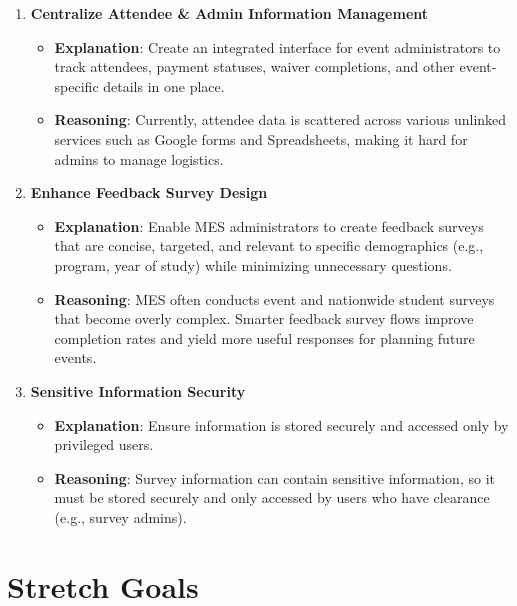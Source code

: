 \documentclass{article}
\begin{document}
\begin{enumerate}[align=left,
  leftmargin=*,
  itemindent=0em,
  label=\bfseries G-\arabic*:]
    \item \textbf{Centralize Attendee \& Admin Information Management}
    \begin{itemize}
        \item \textbf{Explanation}: Create an integrated interface for event administrators to track attendees, payment statuses, waiver completions, and other event-specific details in one place.
        \item \textbf{Reasoning}: Currently, attendee data is scattered across various unlinked services such as Google forms and Spreadsheets, making it hard for admins to manage logistics.
    \end{itemize}

    \item \textbf{Enhance Feedback Survey Design}
    \begin{itemize}
        \item \textbf{Explanation}: Enable MES administrators to create feedback surveys that are concise, targeted, and relevant to specific demographics (e.g., program, year of study) while minimizing unnecessary questions.
        \item \textbf{Reasoning}: MES often conducts event and nationwide student surveys that become overly complex. Smarter feedback survey flows improve completion rates and yield more useful responses for planning future events.
    \end{itemize}

    \item \textbf{Sensitive Information Security}
    \begin{itemize}
        \item \textbf{Explanation}: Ensure information is stored securely and accessed only by privileged users.
        \item \textbf{Reasoning}: Survey information can contain sensitive information, so it must be stored securely
            and only accessed by users who have clearance (e.g., survey admins).
    \end{itemize}
\end{enumerate}

\section{Stretch Goals}
\end{document}
